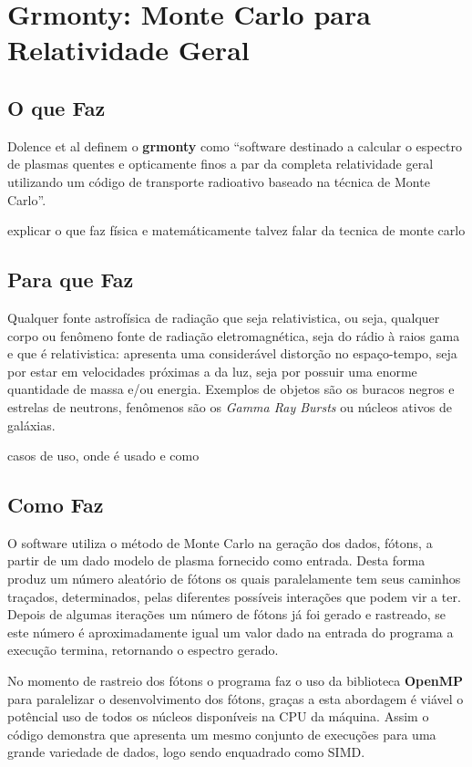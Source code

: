 \chapter{Grmonty: Monte Carlo para Relatividade Geral}
\label{cap:grmonty}

\section{O que Faz}
  Dolence et al definem o \textbf{grmonty} como ``software destinado a calcular o espectro de plasmas quentes e opticamente finos a par da completa relatividade geral utilizando um código de transporte radioativo baseado na técnica de Monte Carlo''\citep[p.1, traduzido]{Dolence:09}.

  explicar o que faz física e matemáticamente
  talvez falar da tecnica de monte carlo
\section{Para que Faz}
  Qualquer fonte astrofísica de radiação que seja relativistica, ou seja, qualquer corpo ou fenômeno fonte de radiação eletromagnética, seja do rádio à raios gama e que é relativistica: apresenta uma considerável distorção no espaço-tempo, seja por estar em velocidades próximas a da luz, seja por possuir uma enorme quantidade de massa e/ou energia. Exemplos de objetos são os buracos negros e estrelas de neutrons, fenômenos são os \textit{Gamma Ray Bursts} ou núcleos ativos de galáxias.

  casos de uso, onde é usado e como

\section{Como Faz}
  O software utiliza o método de Monte Carlo na geração dos dados, fótons, a partir de um dado modelo de plasma fornecido como entrada. Desta forma produz um número aleatório de fótons os quais paralelamente tem seus caminhos traçados, determinados, pelas diferentes possíveis interações que podem vir a ter. Depois de algumas iterações um número de fótons já foi gerado e rastreado, se este número é aproximadamente igual um valor dado na entrada do programa a execução termina, retornando o espectro gerado.

  No momento de rastreio dos fótons o programa faz o uso da biblioteca \textbf{OpenMP} para paralelizar o desenvolvimento dos fótons, graças a esta abordagem é viável o potêncial uso de todos os núcleos disponíveis na CPU da máquina. Assim o código demonstra que apresenta um mesmo conjunto de execuções para uma grande variedade de dados, logo sendo enquadrado como SIMD.

